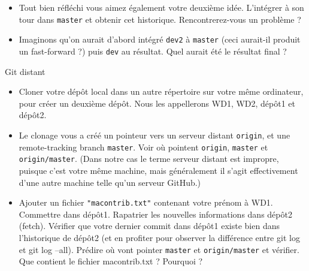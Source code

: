 \documentclass[english, french]{beamer}
\begin{document}
\begin{frame}[allowframebreaks]
\begin{itemize}
{\par
		}
		\item Tout bien réfléchi vous aimez également votre deuxième idée. L’intégrer à son tour dans \texttt{master} et obtenir cet historique. Rencontrerez-vous un problème ?\par
		{
			\centering
			\par
		}
		\item Imaginons qu’on aurait d’abord intégré \texttt{dev2} à \texttt{master} (ceci aurait-il produit un fast-forward ?) puis \texttt{dev} au résultat. Quel aurait été le résultat final ?
	\end{itemize}
	\framebreak
	Git distant
	\begin{itemize}
		\item Cloner votre dépôt local dans un autre répertoire sur votre même ordinateur, pour créer un deuxième dépôt. Nous les appellerons WD1, WD2, dépôt1 et dépôt2.
		\item Le clonage vous a créé un pointeur vers un serveur distant \texttt{origin}, et une \og{}remote-tracking branch\fg{} \texttt{master}. Voir où pointent \texttt{origin}, \texttt{master} et \texttt{origin/master}. (Dans notre cas le terme serveur distant est impropre, puisque c’est votre même machine, mais généralement il s’agit effectivement d’une autre machine telle qu’un serveur GitHub.)
		\item Ajouter un fichier \texttt{"macontrib.txt"} contenant votre prénom à WD1. Commettre dans dépôt1. Rapatrier les nouvelles informations dans dépôt2 (fetch). Vérifier que votre dernier commit dans dépôt1 existe bien dans l’historique de dépôt2 (et en profiter pour observer la différence entre git log et git log --all). Prédire où vont pointer \texttt{master} et \texttt{origin/master} et vérifier. Que contient le fichier macontrib.txt ? Pourquoi ?

\end{itemize}
\end{frame}
\end{document}
